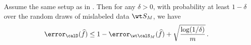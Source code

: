 



\begin{lemma} \label{lem:fit_mislabeled}
    Assume the same setup as in . 
    Then for any $\delta >0$, with probability at least  $1-\delta$ 
    over the random draws of mislabeled data $\wt S_M$, we have 
    \begin{align}
        \error_\calD(\widehat f)  \le 1 -\error_{\wt \calS_M}(\widehat f) + \sqrt{\frac{\log(1/\delta)}{m}}\,. \label{eq:lemma1}
    \end{align}   
\end{lemma} 

